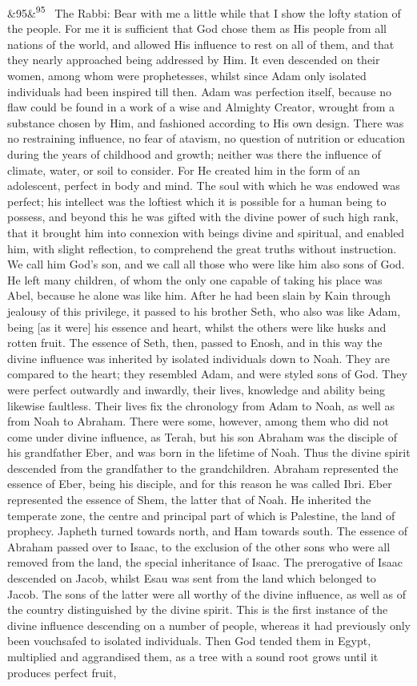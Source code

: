 \documentclass[12pt]{article}
\newcommand{\para}[1][]{\par\noindent\ifx&#1&\else\textsuperscript{\footnotesize #1}~\fi}
\begin{document}
\para[95] The Rabbi: Bear with me a little while that I show the lofty station of the people. For me it is sufficient that God chose them as His people from all nations of the world, and allowed His influence to rest on all of them, and that they nearly approached being addressed by Him. It even descended on their women, among whom were prophetesses, whilst since Adam only isolated individuals had been inspired till then. Adam was perfection itself, because no flaw could be found in a work of a wise and Almighty Creator, wrought from a substance chosen by Him, and fashioned according to His own design. There was no restraining influence, no fear of atavism, no question of nutrition or education during the years of childhood and growth; neither was there the influence of climate, water, or soil to consider. For He created him in the form of an adolescent, perfect in body and mind. The soul with which he was endowed was perfect; his intellect was the loftiest which it is possible for a human being to possess, and beyond this he was gifted with the divine power of such high rank, that it brought him into connexion with beings divine and spiritual, and enabled him, with slight reflection, to comprehend the great truths without instruction. We call him God's son, and we call all those who were like him also sons of God. He left many children, of whom the only one capable of taking his place was Abel, because he alone was like him. After he had been slain by Kain through jealousy of this privilege, it passed to his brother Seth, who also was like Adam, being [as it were] his essence and heart, whilst the others were like husks and rotten fruit. The essence of Seth, then, passed to Enosh, and in this way the divine influence was inherited by isolated individuals down to Noah. They are compared to the heart; they resembled Adam, and were styled sons of God. They were perfect outwardly and inwardly, their lives, knowledge and ability being likewise faultless. Their lives fix the chronology from Adam to Noah, as well as from Noah to Abraham. There were some, however, among them who did not come under divine influence, as Terah, but his son Abraham was the disciple of his grandfather Eber, and was born in the lifetime of Noah. Thus the divine spirit descended from the grandfather to the grandchildren. Abraham represented the essence of Eber, being his disciple, and for this reason he was called Ibri. Eber represented the essence of Shem, the latter that of Noah. He inherited the temperate zone, the centre and principal part of which is Palestine, the land of prophecy. Japheth turned towards north, and Ham towards south. The essence of Abraham passed over to Isaac, to the exclusion of the other sons who were all removed from the land, the special inheritance of Isaac. The prerogative of Isaac descended on Jacob, whilst Esau was sent from the land which belonged to Jacob. The sons of the latter were all worthy of the divine influence, as well as of the country distinguished by the divine spirit. This is the first instance of the divine influence descending on a number of people, whereas it had previously only been vouchsafed to isolated individuals. Then God tended them in Egypt, multiplied and aggrandised them, as a tree with a sound root grows until it produces perfect fruit, 
\end{document}
